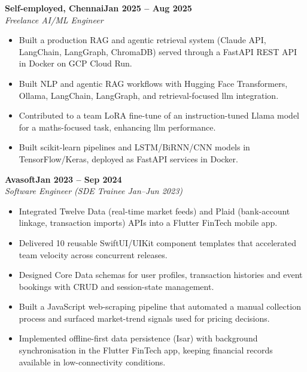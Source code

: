 \documentclass[a4paper,11pt]{article}
\newcommand{\entry}[4]{\needspace{4\baselineskip}\noindent\textbf{#1}\hfill\textbf{#2}\\ \textit{#3}\hfill\textit{#4}\par}
\begin{document}
\vspace{4pt}
\entry{Self-employed, Chennai}{Jan 2025 – Aug 2025}{Freelance AI/ML Engineer}{}
\begin{itemize}
  \item Built a production RAG and agentic retrieval system (Claude API, LangChain, LangGraph, ChromaDB) served through a FastAPI REST API in Docker on GCP Cloud Run.
  \item Built NLP and agentic RAG workflows with Hugging Face Transformers, Ollama, LangChain, LangGraph, and retrieval-focused llm integration.
  \item Contributed to a team LoRA fine-tune of an instruction-tuned Llama model for a maths-focused task, enhancing llm performance.
  \item Built scikit-learn pipelines and LSTM/BiRNN/CNN models in TensorFlow/Keras, deployed as FastAPI services in Docker.
\end{itemize}
\vspace{4pt}
\entry{Avasoft}{Jan 2023 – Sep 2024}{Software Engineer (SDE Trainee Jan–Jun 2023)}{}
\begin{itemize}
  \item Integrated Twelve Data (real-time market feeds) and Plaid (bank-account linkage, transaction imports) APIs into a Flutter FinTech mobile app.
  \item Delivered 10 reusable SwiftUI/UIKit component templates that accelerated team velocity across concurrent releases.
  \item Designed Core Data schemas for user profiles, transaction histories and event bookings with CRUD and session-state management.
  \item Built a JavaScript web-scraping pipeline that automated a manual collection process and surfaced market-trend signals used for pricing decisions.
  \item Implemented offline-first data persistence (Isar) with background synchronisation in the Flutter FinTech app, keeping financial records available in low-connectivity conditions.
\end{itemize}

\end{document}
